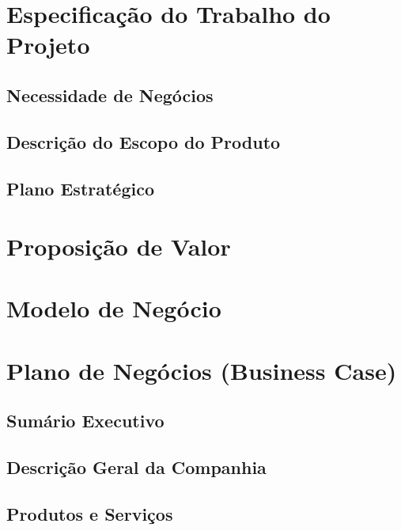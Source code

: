 \chapter{Especificação do Trabalho do Projeto}

\section{Necessidade de Negócios}

\section{Descrição do Escopo do Produto}

\section{Plano Estratégico}

\chapter{Proposição de Valor}


\chapter{Modelo de Negócio}


\chapter{Plano de Negócios (Business Case)}


\section{Sumário Executivo}

\section{Descrição Geral da Companhia}

\section{Produtos e Serviços}

